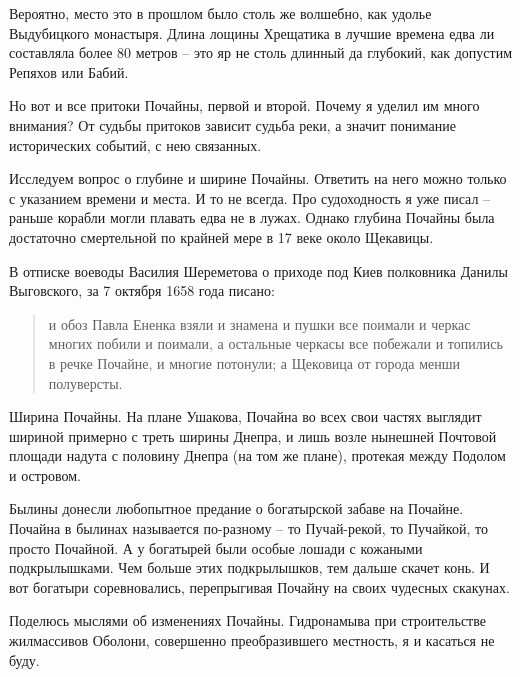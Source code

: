 Вероятно, место это в прошлом было столь же волшебно, как удолье Выдубицкого монастыря. Длина лощины Хрещатика в лучшие времена едва ли составляла более 80 метров – это яр не столь длинный да глубокий, как допустим Репяхов или Бабий. 

Но вот и все притоки Почайны, первой и второй. Почему я уделил им много внимания? От судьбы притоков зависит судьба реки, а значит понимание исторических событий, с нею связанных.

Исследуем вопрос о глубине и ширине Почайны. Ответить на него можно только с указанием времени и места. И то не всегда. Про судоходность я уже писал – раньше корабли могли плавать едва не в лужах. Однако глубина Почайны была достаточно смертельной по крайней мере в 17 веке около Щекавицы.

В отписке воеводы Василия Шереметова о приходе под Киев полковника Данилы Выговского, за 7 октября 1658 года\cite[том 15, стр. 258]{akty} писано:

\begin{quotation}
и обоз Павла Ененка взяли и знамена и пушки все поимали и черкас многих побили и поимали, а остальные черкасы все побежали и топились в речке Почайне, и многие потонули; а Щековица от города менши полуверсты.
\end{quotation}

Ширина Почайны. На плане Ушакова, Почайна во всех свои частях выглядит шириной примерно с треть ширины Днепра, и лишь возле нынешней Почтовой площади надута с половину Днепра (на том же плане), протекая между Подолом и островом.

Былины донесли любопытное предание о богатырской забаве на Почайне. Почайна в былинах называется по-разному – то Пучай-рекой, то Пучайкой, то просто Почайной. А у богатырей были особые лошади с кожаными подкрылышками. Чем больше этих подкрылышков, тем дальше скачет конь. И вот богатыри соревновались, перепрыгивая Почайну на своих чудесных скакунах.

Поделюсь мыслями об изменениях Почайны. Гидронамыва при строительстве жилмассивов Оболони, совершенно преобразившего местность, я и касаться не буду.


